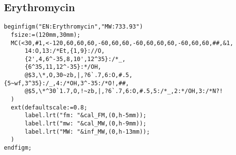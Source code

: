 \documentclass[a4paper]{article}
\begin{document}
\subsection{Erythromycin}
\noindent%
\begin{verbatim}
beginfigm("EN:Erythromycin","MW:733.93")
  fsize:=(120mm,30mm);
  MC(<30,#1,<-120,60,60,60,-60,60,60,-60,60,60,60,-60,60,60,##,&1,
      14:O,13:/*Et,{1,9}://O,
      {2',4,6^-35,8,10',12^35}:/*_,
      {6^35,11,12^-35}:*/OH,
      @$3,\*,O,30~zb,|,?6`.7,6:O,#.5,{5~wf,3^35}:/_,4:/*OH,3^-35:/*O!,##,
      @$5,\*^30`1.7,O,!~zb,|,?6`.7,6:O,#.5,5:/*_,2:*/OH,3:/*N?!
  )
  ext(defaultscale:=0.8;
      label.lrt("fm: "&cal_FM,(0,h-5mm));
      label.lrt("mw: "&cal_MW,(0,h-9mm));
      label.lrt("MW: "&inf_MW,(0,h-13mm));
  )
endfigm;
\end{verbatim}
\end{document}
